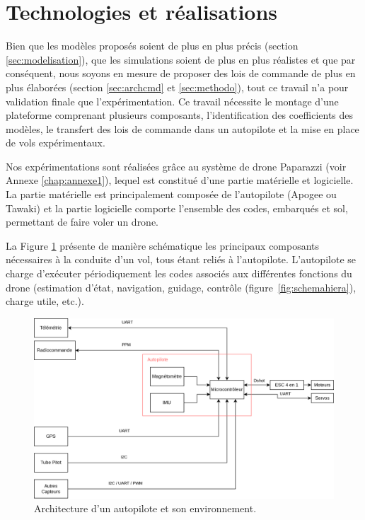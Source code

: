 \section{Technologies et réalisations}

{\color{blue}
Bien que les modèles proposés soient de plus en plus précis (section \ref{sec:modelisation}), que les simulations soient de plus en plus réalistes et que par conséquent, nous soyons en mesure de proposer des lois de commande de plus en plus élaborées (section \ref{sec:archcmd} et \ref{sec:methodo}), tout ce travail n'a pour validation finale que l'expérimentation. Ce travail nécessite  le montage d'une plateforme comprenant plusieurs composants, l'identification des coefficients des modèles, le transfert des lois de commande dans un autopilote et la mise en place de vols expérimentaux.
}


Nos expérimentations sont réalisées grâce au système de drone Paparazzi (voir Annexe \ref{chap:annexe1}), lequel est constitué d'une partie matérielle et logicielle. La partie matérielle est principalement composée de l'autopilote (Apogee ou Tawaki) et la partie logicielle comporte l'ensemble des codes, embarqués et sol, permettant de faire voler un drone. 

La Figure \ref{fig:schemaComposent} présente de manière schématique les principaux composants nécessaires à la conduite d'un vol, tous étant reliés à l'autopilote. L'autopilote se charge d'exécuter périodiquement les codes associés aux différentes fonctions du drone (estimation d'état, navigation, guidage, contrôle (figure~\ref{fig:schemahiera}), charge utile, etc.).

\begin{figure}[ht!]
    \centerline{
    \includegraphics[trim=0cm 0cm 0cm 0cm,clip,width=0.9\columnwidth]{figures/arch_materiel.png}}
    \caption{Architecture d'un autopilote et son environnement.}
    \label{fig:schemaComposent}
\end{figure}


